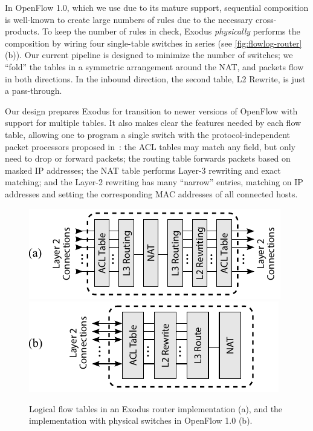 In OpenFlow 1.0, which we use due to its mature support, sequential composition
is well-known to create large numbers of rules due to the necessary
cross-products.  To keep the number of rules in check, Exodus \emph{physically}
performs the composition by wiring four single-table switches in series (see
\autoref{fig:flowlog-router}(b)).
Our current pipeline is designed to minimize the number of switches; we
``fold'' the tables in a symmetric arrangement around the NAT, and packets flow
in both directions. In the inbound direction, the second table, L2 Rewrite, is
just a pass-through.

Our design prepares Exodus for transition to newer versions of OpenFlow with
support for multiple tables.  It also makes clear the features needed by each
flow table, allowing one to program a single switch with the
protocol-independent packet processors proposed
in~\cite{Bosshart:2013ppipp-arxiv}: the ACL tables may match any field, but
only need to drop or forward packets; the routing table forwards packets based
on masked IP addresses; the NAT table performs Layer-3 rewriting and exact
matching; and the Layer-2 rewriting has many ``narrow'' entries, matching on IP
addresses and setting the corresponding MAC addresses of all connected hosts.

\begin{figure}
  \centering
  \includegraphics[scale=1.2]{figs/flowlog-router-unfolded}
  \includegraphics[scale=1.2]{figs/flowlog-router-folded}
  \caption{Logical flow tables in an Exodus router implementation (a), and the implementation
with physical switches in OpenFlow 1.0 (b).}
  \label{fig:flowlog-router}
\end{figure}

